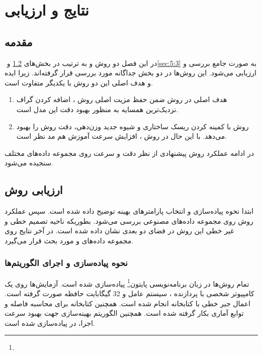 
\chapter{نتایج و ارزیابی}\label{ch:5}
\section{مقدمه}\label{sec:5:1}
در این فصل دو روش  و  به ترتیب در بخش‌های ‏\ref{sec:5:2} و ‏\ref{sec:5:3} به صورت جامع بررسی و ارزیابی می‌شود. این روش‌ها در دو بخش جداگانه مورد بررسی قرار گرفته‌اند. زیرا ایده و هدف اصلی این دو روش با یکدیگر متفاوت است. 
\begin{enumerate}
	\item هدف اصلی در روش  ضمن حفظ مزیت اصلی روش ، اضافه کردن گراف نزدیک‌ترین همسایه به منظور بهبود دقت این مدل است.
	\item 	روش  با کمینه کردن ریسک ساختاری و شیوه جدید وزن‌دهی، دقت روش  را بهبود می‌دهد. با این حال در روش ، افزایش سرعت آموزش هم مد نظر است.
\end{enumerate}

در ادامه عملکرد روش پیشنهادی از نظر دقت و سرعت روی مجموعه داده‌های مختلف سنجیده می‌شود.

\section{ارزیابی روش }\label{sec:5:2}
ابتدا نحوه پیاده‌سازی و انتخاب پارامترهای بهینه توضیح داده شده است. سپس عملکرد روش  روی مجموعه داده‌های مصنوعی بررسی می‌شود. بطوریکه ناحیه تصمیم خطی و غیر خطی این روش در فضای دو بعدی نشان داده شده است. در آخر نتایج روی مجموعه داده‌های  و  مورد بحث قرار می‌گیرد.

\subsection{نحوه پیاده‌سازی و اجرای الگوریتم‌ها}\label{sec:5:2:1}
تمام روش‌ها در زبان برنامه‌نویسی پایتون\footnote{}  \cite{ceder2010} پیاده‌سازی شده است. آزمایش‌ها روی یک کامپیوتر شخصی با پردازنده ، سیستم عامل  و 32 گیگابایت حافظه صورت گرفته است. اعمال جبر خطی با کتابخانه  \cite{walt2011} انجام شده است. همچنین کتابخانه  \cite{jones2014} برای محاسبه فاصله و توابع آماری بکار گرفته شده است. همچنین الگوریتم بهینه‌سازی  جهت بهبود سرعت اجرا، در  \cite{behnel2011} پیاده‌سازی شده است.

